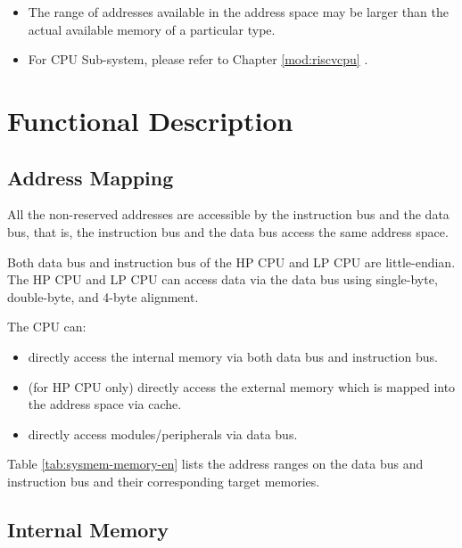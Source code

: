\documentclass[main\_\_EN.tex]{subfiles}
\begin{document}
\begin{tiplisting}
\vspace{-2em}
\begin{itemize}
    \item The range of addresses available in the address space may be larger than the actual available memory of a particular type.
    \item For CPU Sub-system, please refer to Chapter \ref{mod:riscvcpu} \textit{}.
\end{itemize}
\end{tiplisting}

\section{Functional Description}

\subsection{Address Mapping}

All the non-reserved addresses are accessible by the instruction bus and the data bus, that is, the instruction bus and the data bus access the same address space.

Both data bus and instruction bus of the HP CPU and LP CPU are little-endian.
The HP CPU and LP CPU can access data via the data bus using single-byte, double-byte, and 4-byte alignment.

The CPU can:
\begin{itemize}
\item directly access the internal memory via both data bus and instruction bus.
\item (for HP CPU only) directly access the external memory which is mapped into the address space via cache.
\item directly access modules/peripherals via data bus.
\end{itemize}

Table \ref{tab:sysmem-memory-en} lists the address ranges on the data bus and instruction bus and their corresponding target memories.




\subsection{Internal Memory}
\label{para:sysmem-internal-memory}
\end{document}
